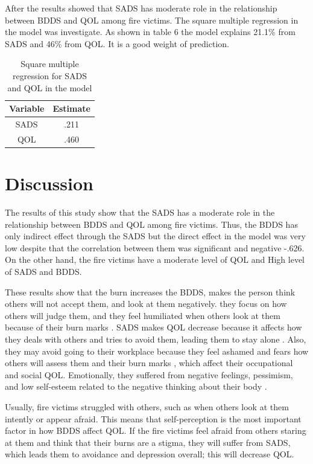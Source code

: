 \documentclass[10pt]{NSP1}
\begin{document}
	\noindent After the results showed that SADS has moderate role in the relationship between BDDS and QOL among fire victims. The square multiple regression in the model was investigate. As shown in table 6 the model explains 21.1\% from SADS and 46\% from QOL. It is a good weight of prediction.
	
	\begin{table}[H]
		\centering
		\caption{Square multiple regression for SADS and QOL in the model}
		\label{tab:rsq}
		\vspace{5pt}
		\small
		\begin{tabular}{cc}
			\hline
			Variable & Estimate \\
			\hline
			SADS & .211 \\
			QOL & .460 \\
			\hline
		\end{tabular}
	\end{table} 
	
	\section{Discussion}
	The results of this study show that the SADS has a moderate role in the relationship between BDDS and QOL among fire victims. Thus, the BDDS has only indirect effect through the SADS but the direct effect in the model was very low despite that the correlation between them was significant and negative -.626. On the other hand, the fire victims have a moderate level of QOL and High level of SADS and BDDS.
	
	These results show that the burn increases the BDDS, makes the person think others will not accept them, and look at them negatively. they focus on how others will judge them, and they feel humiliated when others look at them because of their burn marks \cite{Suluhan2023}. SADS makes QOL decrease because it affects how they deals with others and tries to avoid them, leading them to stay alone \cite{Gorbani2021}. Also, they may avoid going to their workplace because they feel ashamed and fears how others will assess them and their burn marks \cite{Hussain2023}, which affect their occupational and social QOL. Emotionally, they suffered from negative feelings, pessimism, and low self-esteem related to the negative thinking about their body \cite{Yesilyurt2024}.
	
	Usually, fire victims struggled with others, such as when others look at them intently or appear afraid. This means that self-perception is the most important factor in how BDDS affect QOL. If the fire victims feel afraid from others staring at them and think that their burns are a stigma, they will suffer from SADS, which leads them to avoidance and depression overall; this will decrease QOL.
	
\end{document}
